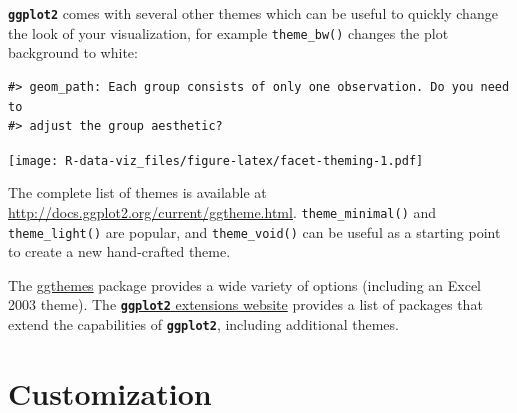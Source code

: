 \documentclass[]{book}
\newenvironment{Shaded}{\begin{snugshade}}{\end{snugshade}}
\newcommand{\KeywordTok}[1]{\textcolor[rgb]{0.13,0.29,0.53}{\textbf{#1}}}
\newcommand{\DataTypeTok}[1]{\textcolor[rgb]{0.13,0.29,0.53}{#1}}
\newcommand{\StringTok}[1]{\textcolor[rgb]{0.31,0.60,0.02}{#1}}
\newcommand{\OtherTok}[1]{\textcolor[rgb]{0.56,0.35,0.01}{#1}}
\newcommand{\OperatorTok}[1]{\textcolor[rgb]{0.81,0.36,0.00}{\textbf{#1}}}
\newcommand{\NormalTok}[1]{#1}
\theoremstyle{definition}
\theoremstyle{definition}
\theoremstyle{definition}
\theoremstyle{remark}
\begin{document}
\textbf{\texttt{ggplot2}} comes with several other themes which can be
useful to quickly change the look of your visualization, for example
\texttt{theme\_bw()} changes the plot background to white:

\begin{Shaded}
\end{Shaded}

\begin{verbatim}
#> geom_path: Each group consists of only one observation. Do you need to
#> adjust the group aesthetic?
\end{verbatim}

\texttt{[image: R-data-viz\_files/figure-latex/facet-theming-1.pdf]}

The complete list of themes is available at
\url{http://docs.ggplot2.org/current/ggtheme.html}.
\texttt{theme\_minimal()} and \texttt{theme\_light()} are popular, and
\texttt{theme\_void()} can be useful as a starting point to create a new
hand-crafted theme.

The
\href{https://cran.r-project.org/web/packages/ggthemes/vignettes/ggthemes.html}{ggthemes}
package provides a wide variety of options (including an Excel 2003
theme). The
\href{https://www.ggplot2-exts.org}{\textbf{\texttt{ggplot2}} extensions
website} provides a list of packages that extend the capabilities of
\textbf{\texttt{ggplot2}}, including additional themes.

\section{Customization}\label{customization}
\end{document}
